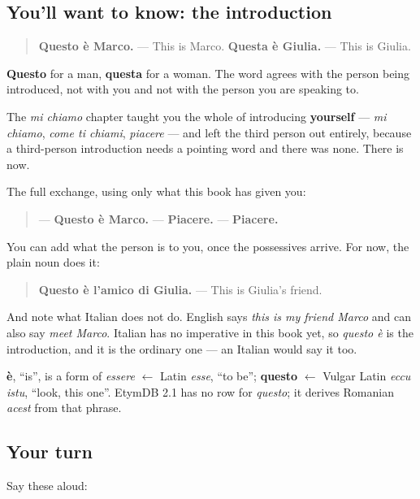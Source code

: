\subsection*{You'll want to know: the introduction}
\begin{quote}
\textbf{Questo è Marco.} — This is Marco. \textbf{Questa è Giulia.} — This is Giulia.
\end{quote}

\textbf{Questo} for a man, \textbf{questa} for a woman. The word agrees with the person being introduced, not with you and not with the person you are speaking to.

The \emph{mi chiamo} chapter taught you the whole of introducing \textbf{yourself} — \emph{mi chiamo}, \emph{come ti chiami}, \emph{piacere} — and left the third person out entirely, because a third-person introduction needs a pointing word and there was none. There is now.

The full exchange, using only what this book has given you:

\begin{quote}
— \textbf{Questo è Marco.} — \textbf{Piacere.} — \textbf{Piacere.}
\end{quote}

You can add what the person is to you, once the possessives arrive. For now, the plain noun does it:

\begin{quote}
\textbf{Questo è l'amico di Giulia.} — This is Giulia's friend.
\end{quote}

And note what Italian does not do. English says \emph{this is my friend Marco} and can also say \emph{meet Marco}. Italian has no imperative in this book yet, so \emph{questo è} is the introduction, and it is the ordinary one — an Italian would say it too.

\begin{cousinweb}
\textbf{è}, \textquotedblleft{}is\textquotedblright{}, is a form of \emph{essere} $\leftarrow$ Latin \emph{esse}, \textquotedblleft{}to be\textquotedblright{}; \textbf{questo} $\leftarrow$ Vulgar Latin \emph{eccu istu}, \textquotedblleft{}look, this one\textquotedblright{}. EtymDB 2.1 has no row for \emph{questo}; it derives Romanian \emph{acest} from that phrase.
\end{cousinweb}

\subsection*{Your turn}
Say these aloud:

